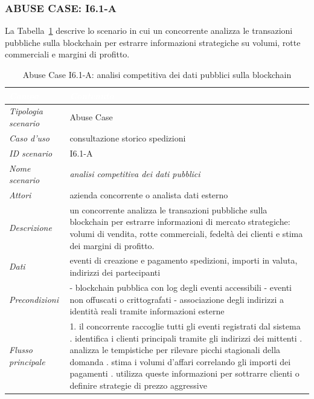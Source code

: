 \subsubsection*{ABUSE CASE: I6.1-A}
La Tabella~\ref{tab:i61a} descrive lo scenario in cui un concorrente analizza le transazioni pubbliche sulla blockchain per estrarre informazioni strategiche su volumi, rotte commerciali e margini di profitto.
\begin{longtable}{| >{\columncolor{abuseCol}}p{} | p{} |}
\caption{Abuse Case I6.1-A: analisi competitiva dei dati pubblici sulla blockchain}\label{tab:i61a}\\
\hline
\rowcolor{abuseHeader} \textcolor{white}{\textit{Campo}} & \textcolor{white}{\textit{Contenuto}} \\
\hline
\textit{Tipologia scenario} & Abuse Case \\
\hline
\textit{Caso d'uso} & consultazione storico spedizioni \\
\hline
\textit{ID scenario} & I6.1-A \\
\hline
\textit{Nome scenario} & \textit{analisi competitiva dei dati pubblici} \\
\hline
\textit{Attori} & azienda concorrente o analista dati esterno \\
\hline
\textit{Descrizione} & un concorrente analizza le transazioni pubbliche sulla blockchain per estrarre informazioni di mercato strategiche: volumi di vendita, rotte commerciali, fedeltà dei clienti e stima dei margini di profitto. \\
\hline
\textit{Dati} & eventi di creazione e pagamento spedizioni, importi in valuta, indirizzi dei partecipanti \\
\hline
\textit{Precondizioni} & - blockchain pubblica con log degli eventi accessibili \newline - eventi non offuscati o crittografati \newline - associazione degli indirizzi a identità reali tramite informazioni esterne \\
\hline
\textit{Flusso principale} & 1. il concorrente raccoglie tutti gli eventi registrati dal sistema \newline 2. identifica i clienti principali tramite gli indirizzi dei mittenti \newline 3. analizza le tempistiche per rilevare picchi stagionali della domanda \newline 4. stima i volumi d'affari correlando gli importi dei pagamenti \newline 5. utilizza queste informazioni per sottrarre clienti o definire strategie di prezzo aggressive \\

\end{longtable}

